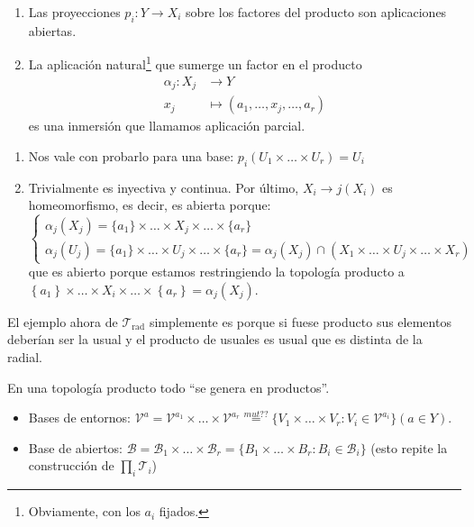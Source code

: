 \begin{prop}
\begin{enumerate}
    \item Las proyecciones $p_i: Y \rightarrow X_i$ sobre los factores del producto son aplicaciones abiertas. 
    \item La aplicación natural\footnote{Obviamente, con los $a_i$ fijados.} que sumerge un factor en el producto 
	\begin{align*}
	 \alpha_j : X_j &\longrightarrow Y \\
	 x_j &\longmapsto \left( a_1, \ldots, x_j, \ldots, a_r \right)	
	\end{align*}	    
     es una inmersión que llamamos aplicación parcial.
\end{enumerate}
\end{prop}
\begin{demo}
\begin{enumerate}
    \item Nos vale con probarlo para una base: $p_i\left( U_1 \times \ldots \times U_r \right) = U_i$ 
    \item Trivialmente es inyectiva y continua. Por último, $X_i \rightarrow j\left( X_i \right)$ es homeomorfismo, es decir, es abierta porque:
    \[
    \begin{cases}
        \alpha_j\left( X_j \right) = \{a_1\} \times \ldots \times X_j \times \ldots \times \{a_r\} \\
        \alpha_j\left( U_j \right) = \{a_1\} \times \ldots \times U_j \times \ldots \times \{a_r\} = \alpha_j\left( X_j \right) \cap \left( X_1 \times \ldots \times U_j \times \ldots \times X_r \right) 
    \end{cases}
    \]
    que es abierto porque estamos restringiendo la topología producto a $\left\{ a_1 \right\} \times \ldots \times X_i \times \ldots \times \left\{ a_r \right\} = \alpha_j\left( X_j \right)$.
\end{enumerate}
\end{demo}

\begin{ej}
El ejemplo ahora de $\mathcal{T}_{\text{rad}}$ simplemente es porque si fuese producto sus elementos deberían ser la usual y el producto de usuales es usual que es distinta de la radial.
\end{ej}

\begin{pg}
En una topología producto todo ``se genera en productos''.
\begin{ej}
\begin{itemize}
    \item Bases de entornos: $\mathcal{V}^a = \mathcal{V}^{a_1} \times \ldots \times \mathcal{V}^{a_r} \stackrel{mut??}{=} \{V_1 \times \ldots \times V_r: V_i \in \mathcal{V}^{a_i}\} \left( a \in Y \right)$.
    \item Base de abiertos: $\mathcal{B} = \mathcal{B}_1 \times \ldots \times \mathcal{B}_r = \{B_1 \times \ldots \times B_r: B_i \in \mathcal{B}_i\}$ (esto repite la construcción de $\prod_{i} \mathcal{T}_i$)
\end{itemize}
\end{ej}
\end{pg}


